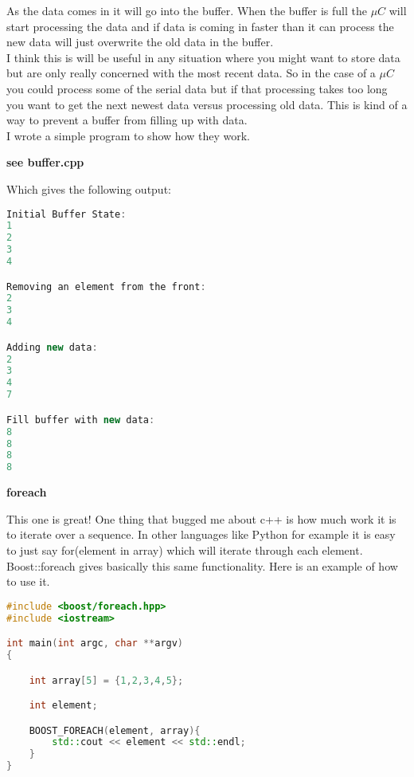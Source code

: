 \documentclass[a4paper,12pt]{article}
\begin{document}
As the data comes in it will go into the buffer.  When the buffer is full the $\mu C$ will start processing the data and if data is coming in faster than it can process the new data will just overwrite the old data in the buffer.\\

I think this is will be useful in any situation where you might want to store data but are only really concerned with the most recent data.  So in the case of a $\mu C$ you could process some of the serial data but if that processing takes too long you want to get the next newest data versus processing old data.  This is kind of a way to prevent a buffer from filling up with data. \\

I wrote a simple program to show how they work. 
 
\textbf{see buffer.cpp}

\newpage

Which gives the following output:
\begin{lstlisting}[language=cpp,caption={circular buffer output}]
Initial Buffer State:
1
2
3
4

Removing an element from the front:
2
3
4

Adding new data:
2
3
4
7

Fill buffer with new data:
8
8
8
8
\end{lstlisting}


\textbf{foreach}

This one is great! One thing that bugged me about c++ is how much work it is to iterate over a sequence.  In other languages like Python for example it is easy to just say for(element in array) which will iterate through each element. Boost::foreach gives basically this same functionality. Here is an example of how to use it.  

\begin{lstlisting}[language=cpp,caption={foreach}]
#include <boost/foreach.hpp>
#include <iostream>

int main(int argc, char **argv)
{

    int array[5] = {1,2,3,4,5};

    int element;

    BOOST_FOREACH(element, array){
        std::cout << element << std::endl;
    }
}
\end{lstlisting}
\end{document}
